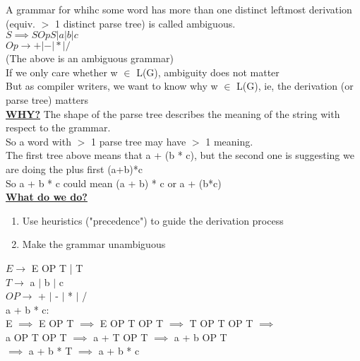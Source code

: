 \documentclass[12pt]{article}
\newcommand{\myt}[1]{\textbf{\underline{#1}}}
\begin{document}
	A grammar for whihc some word has more than one distinct leftmost derivation (equiv. $>$ 1 distinct parse tree) is called ambiguous.\\
	$S \implies S Op S | a | b | c$\\
	$Op \rightarrow + | - | * | /$\\
	(The above is an ambiguous grammar)\\
	If we only care whether w $\in$ L(G), ambiguity does not matter\\
	
	But as compiler writers, we want to know why w $\in$ L(G), ie, the derivation (or parse tree) matters\\
	
	\myt{WHY?} The shape of the parse tree describes the meaning of the string with respect to the grammar.\\
	
	So a word with $>$ 1 parse tree may have $>$ 1 meaning.\\
	
	The first tree above means that a + (b * c), but the second one is suggesting we are doing the plus first (a+b)*c\\
	
	So a + b * c could mean (a + b) * c or a + (b*c)\\
	
	\myt{What do we do?}\\
	
	\begin{enumerate}
		\item Use heuristics ("precedence") to guide the derivation process
		\item Make the grammar unambiguous\\
	\end{enumerate}
	
	$E \rightarrow$ E OP T | T\\
	$T \rightarrow$ a $|$ b $|$ c\\
	$OP \rightarrow$ + $|$ - $|$ * $|$ /\\
	
	a + b * c:\\
	E $\implies$ E OP T $\implies$ E OP T OP T $\implies$ T OP T OP T $\implies$\\
	 a OP T OP T $\implies$ a + T OP T $\implies$ a + b OP T \\
	 $\implies$ a + b * T $\implies$ a + b * c \\ 
	 
	 \begin{center}\end{center}
	 
\end{document}
